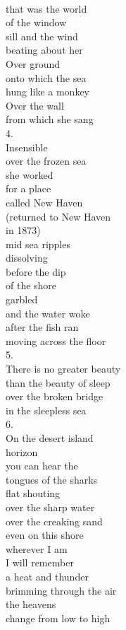 \documentclass[smalldemyvopaper,11pt,twoside,onecolumn,openright,extrafontsizes]{memoir}
\begin{document}
\\that was the world
\\of the window
\\sill and the wind
\\beating about her
\\Over ground
\\onto which the sea
\\hung like a monkey
\\Over the wall
\\from which she sang
\\4.
\\Insensible
\\over the frozen sea
\\she worked
\\for a place
\\called New Haven
\\(returned to New Haven
\\in 1873)
\\mid sea ripples
\\dissolving
\\before the dip
\\of the shore
\\garbled
\\and the water woke
\\after the fish ran
\\moving across the floor
\\5.
\\There is no greater beauty
\\than the beauty of sleep
\\over the broken bridge
\\in the sleepless sea
\\6.
\\On the desert island
\\horizon
\\you can hear the
\\tongues of the sharks
\\flat shouting
\\over the sharp water
\\over the creaking sand
\\even on this shore
\\wherever I am
\\I will remember
\\a heat and thunder
\\brimming through the air
\\the heavens
\\change from low to high
\end{document}
